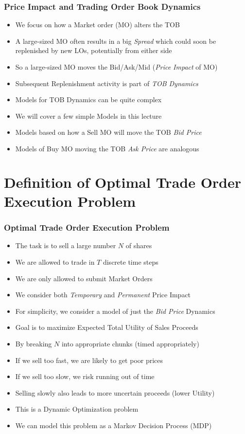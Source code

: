 \documentclass[handout]{beamer}
\begin{document}
\begin{frame}
\frametitle{Price Impact and Trading Order Book Dynamics}
\pause
\begin{itemize}[<+->]
\item We focus on how a Market order (MO) alters the TOB
\item A large-sized MO often results in a big {\em Spread} which could soon be replenished by new LOs, potentially from either side
\item So a large-sized MO moves the Bid/Ask/Mid ({\em Price Impact} of MO)
\item Subsequent Replenishment activity is part of {\em TOB Dynamics}
\item Models for TOB Dynamics can be quite complex
\item We will cover a few simple Models in this lecture
\item Models based on how a Sell MO will move the TOB {\em Bid Price}
\item Models of Buy MO moving the TOB {\em Ask Price} are analogous
\end{itemize}
\end{frame}

\section{Definition of Optimal Trade Order Execution Problem}

\begin{frame}
\frametitle{Optimal Trade Order Execution Problem}
\pause
\begin{itemize}[<+->]
\item The task is to sell a large number $N$ of shares
\item We are allowed to trade in $T$ discrete time steps
\item We are only allowed to submit Market Orders
\item We consider both {\em Temporary} and {\em Permanent} Price Impact
\item For simplicity, we consider a model of just the {\em Bid Price} Dynamics
\item Goal is to maximize Expected Total Utility of Sales Proceeds
\item By breaking $N$ into appropriate chunks (timed appropriately)
\item If we sell too fast, we are likely to get poor prices
\item If we sell too slow, we risk running out of time
\item Selling slowly also leads to more uncertain proceeds (lower Utility)
\item This is a Dynamic Optimization problem
\item We can model this problem as a Markov Decision Process (MDP)
\end{itemize}
\end{frame}
\end{document}
